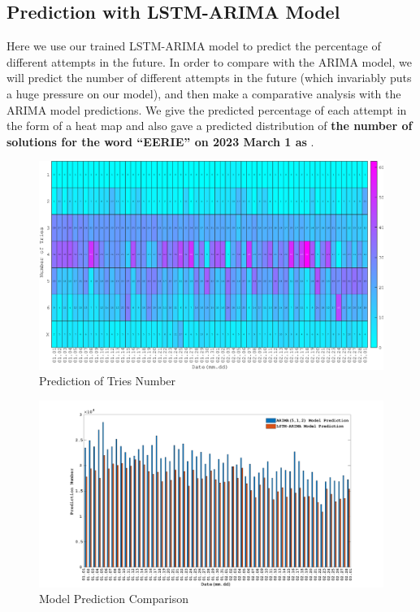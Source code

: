 \documentclass[12pt]{article}  %
\begin{document}
\subsection{Prediction with LSTM-ARIMA Model}
Here we use our trained LSTM-ARIMA model to predict the percentage of different attempts in the future. In order to compare with the ARIMA model, we will predict the number of different attempts in the future (which invariably puts a huge pressure on our model), and then make a comparative analysis with the ARIMA model predictions. We give the predicted percentage of each attempt in the form of a heat map and also gave a predicted distribution of \textbf{the number of solutions for the word ``EERIE'' on 2023 March 1 as} .
\begin{figure}[htpb]
\centering
\includegraphics[width=.8\textwidth]{img/hmap.eps}
\caption{Prediction of Tries Number}
\end{figure}
\begin{figure}[htbp]
\centering
\includegraphics[width=.95\textwidth]{img/lstm.pdf}
\caption{Model Prediction Comparison}
\end{figure}
\end{document}
